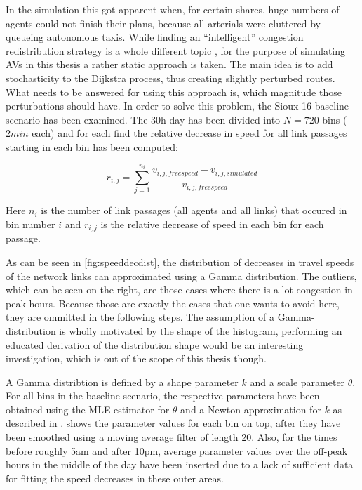 In the simulation this got apparent when, for certain shares, huge numbers of
agents could not finish their plans, because all arterials were cluttered by
queueing autonomous taxis. While finding an ``intelligent'' congestion redistribution strategy is a whole
different topic , for the purpose of simulating AVs in this thesis a rather static approach
is taken. The main idea is to add stochasticity to the Dijkstra process, thus creating
slightly perturbed routes. What needs to be answered for using this approach is,
which magnitude those perturbations should have. In order to solve this problem,
the Sioux-16 baseline scenario has been examined. The 30h day has been divided
into $N=720$ bins ($2min$ each) and for each find the relative decrease in speed for all link
passages starting in each bin has been computed:

\begin{equation}
r_{i,j} = \sum_{j=1}^{n_i} \frac{v_{i,j,freespeed} - v_{i,j,simulated}}{v_{i,j,freespeed}}
\end{equation}

Here $n_i$ is the number of link passages (all agents and all links) that occured
in bin number $i$ and $r_{i,j}$ is the relative decrease of speed in each bin for
each passage.

As can be seen in \cref{fig:speeddecdist}, the distribution of decreases in travel
speeds of the network links can approximated using a Gamma distribution. The outliers,
which can be seen on the right, are those cases where there is a lot congestion in
peak hours. Because those are exactly the cases that one wants to avoid here, they
are ommitted in the following steps.
The assumption of a Gamma-distribution is wholly motivated by the shape of the histogram,
performing an educated derivation of the distribution shape would be an interesting
investigation, which is out of the scope of this thesis though.

A Gamma distribtion is defined by a shape parameter $k$ and a scale parameter $\theta$. For
all bins in the baseline scenario, the respective parameters have been obtained using
the MLE estimator for $\theta$ and a Newton approximation for $k$ as described in
.  shows the parameter values for each bin on top,
after they have been smoothed using a moving average filter of length $20$. Also,
for the times before roughly 5am and after 10pm, average parameter values over the
off-peak hours in the middle of the day have been inserted due to a lack of sufficient
data for fitting the speed decreases in these outer areas.

